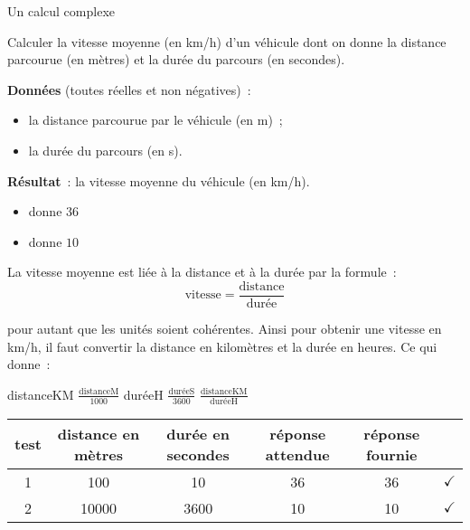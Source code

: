 \begin{Fiche}{Un calcul complexe}
\label{fiche:calcul-complexe}

	Calculer la vitesse moyenne (en km/h) d’un véhicule dont on donne
	la distance parcourue (en mètres)
	et la durée du parcours (en secondes). 

	
	\textbf{Données} (toutes réelles et non négatives)~:
		\begin{itemize}
		\item la distance parcourue par le véhicule (en m)~;
		\item la durée du parcours (en s).
		\end{itemize}
		
	\textbf{Résultat}~: la vitesse moyenne du véhicule (en km/h).

	\begin{center}
	\end{center}


	\begin{itemize}
	\item {} donne $36$
	\item {} donne $10$
	\end{itemize}


	La vitesse moyenne est liée à la distance et à la durée par la formule~:
	\[
		\textrm{vitesse} = \frac{\textrm{distance}}{\textrm{durée}}
	\]

	pour autant que les unités soient cohérentes.
	Ainsi pour obtenir une vitesse en km/h, 
	il faut convertir la distance en kilomètres 
	et la durée en heures.
	Ce qui donne~:
		
	\begin{LDA}
			\Let distanceKM \Gets $\frac{\textrm{distanceM}}{1000}$
			\Let duréeH \Gets $\frac{\textrm{duréeS}}{3600}$
			\Return $\frac{\textrm{distanceKM}}{\textrm{duréeH}}$
		\EndAlgo
	\end{LDA}


	\begin{center}
		\begin{tabular}{|c|cccc|c|}
		\hline
		test \no & distance en mètres & durée en secondes & réponse attendue & réponse fournie & {} \\\hline
		\hline 
		1 & 100   & 10   & 36 & 36 & {\color{ForestGreen}$\checkmark$} \\\hline
		2 & 10000 & 3600 & 10 & 10 & {\color{ForestGreen}$\checkmark$} \\\hline
		\end{tabular}
	\end{center}								


\end{Fiche}
